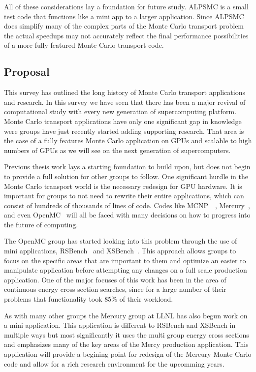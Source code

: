 All of these considerations lay a foundation for future study.
%
ALPSMC is a small test code that functions like a mini app to a larger application.
%
Since ALPSMC does simplify many of the complex parts of the Monte Carlo transport problem the actual speedups may not accurately reflect the final performance possibilities of a more fully featured Monte Carlo transport code.
%

\subsection{Proposal}

This survey has outlined the long history of Monte Carlo transport applications and research.
%
In this survey we have seen that there has been a major revival of computational study with every new generation of supercomputing platform.
%
Monte Carlo transport applications have only one significant gap in knowledge were groups have just recently started adding supporting research.
%
That area is the case of a fully features Monte Carlo application on GPUs and scalable to high numbers of GPUs as we will see on the next generation of supercomputers.

Previous thesis work lays a starting foundation to build upon, but does not begin to provide a full solution for other groups to follow.
%
One significant hurdle in the Monte Carlo transport world is the necessary redesign for GPU hardware.
%
It is important for groups to not need to rewrite their entire applications, which can consist of hundreds of thousands of lines of code.
%
Codes like MCNP~\cite{goorley2012initial}~\cite{padovani2012mcnpx}, Mercury~\cite{brantley2013recent}, and even OpenMC~\cite{romano2015openmc}
will all be faced with many decisions on how to progress into the future of computing.

The OpenMC group has started looking into this problem through the use of mini applications, RSBench~\cite{tramm2014performance} and XSBench~\cite{tramm2014xsbench}. 
%
This approach allows groups to focus on the specific areas that are important to them and optimize an easier to manipulate application before attempting any changes on a full scale production application.
%
One of the major focuses of this work has been in the area of continuous energy cross section searches, since for a large number of their problems that functionality took \~85\% of their workload.

As with many other groups the Mercury group at LLNL has also begun work on a mini application.
%
This application is different to RSBench and XSBench in multiple ways but most significantly it uses the multi group energy cross sections and emphasizes  many of the key areas of the Mercy production application.
%
This application will provide a begining point for redesign of the Mercury Monte Carlo code and allow for a rich research environment for the upcomming years.
%

